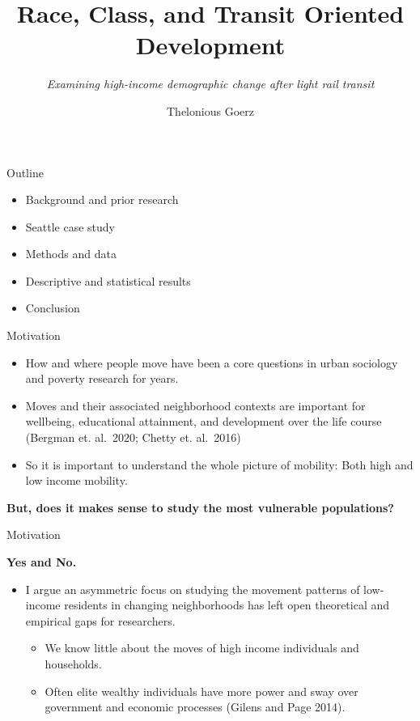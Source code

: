 \documentclass[11pt,ignorenonframetext,]{beamer}
\title{Race, Class, and Transit Oriented Development}
\subtitle{\emph{Examining high-income demographic change after light rail transit}}
\author{Thelonious Goerz}
\institute{Dept. of Sociology\\
Johns Hopkins University\\
Center for Studies in Demography and Ecology}
\date{}
\providecommand{\tightlist}{%
  \setlength{\itemsep}{0pt}\setlength{\parskip}{0pt}}
\begin{document}
\frame{\titlepage}

\begin{frame}{Outline}
\protect\hypertarget{outline}{}

\begin{itemize}
\tightlist
\item
  Background and prior research
\item
  Seattle case study
\item
  Methods and data
\item
  Descriptive and statistical results
\item
  Conclusion
\end{itemize}

\end{frame}

\begin{frame}{Motivation}
\protect\hypertarget{motivation}{}

\begin{itemize}
\tightlist
\item
  How and where people move have been a core questions in urban
  sociology and poverty research for years.
\item
  Moves and their associated neighborhood contexts are important for
  wellbeing, educational attainment, and development over the life
  course (Bergman et. al.~2020; Chetty et. al.~2016)
\item
  So it is important to understand the whole picture of mobility: Both
  high and low income mobility.
\end{itemize}

\textbf{But, does it makes sense to study the most vulnerable
populations?}

\end{frame}

\begin{frame}{Motivation}
\protect\hypertarget{motivation-1}{}

\textbf{Yes and No.}

\begin{itemize}
\tightlist
\item
  I argue an asymmetric focus on studying the movement patterns of
  low-income residents in changing neighborhoods has left open
  theoretical and empirical gaps for researchers.

  \begin{itemize}
  \tightlist
  \item
    We know little about the moves of high income individuals and
    households.
  \item
    Often elite wealthy individuals have more power and sway over
    government and economic processes (Gilens and Page 2014).
  \end{itemize}
\end{itemize}

\end{frame}
\end{document}

